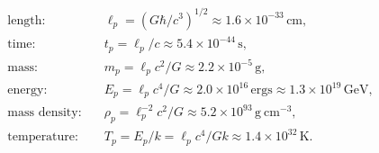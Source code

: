 \begin{align*}
  \text{length:}\quad &\ell_p=(G\hbar/c^3)^{1/2}\approx1.6\times10^{-33}\,\mathrm{cm},\\
  \text{time:}\quad &t_p=\ell_p/c\approx5.4\times10^{-44}\,\mathrm{s},\\
  \text{mass:}\quad &m_p=\ell_pc^2/G\approx2.2\times10^{-5}\,\mathrm{g},\\
  \text{energy:}\quad &E_p=\ell_pc^4/G\approx2.0\times10^{16}\,\mathrm{ergs}
    \approx1.3\times10^{19}\,\mathrm{GeV},\\
  \text{mass density:}\quad &\rho_p=\ell_p^{-2}c^2/G
    \approx5.2\times10^{93}\,\mathrm{g\ cm}^{-3},\\
  \text{temperature:}\quad &T_p=E_p/k=\ell_pc^4/Gk
    \approx1.4\times10^{32}\,\mathrm{K}.
\end{align*}

\clearpage
\thispagestyle{empty}
\null
\clearpage
